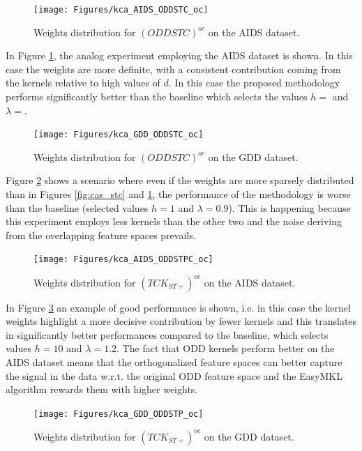 \begin{figure}[ht]
    \centering
    \texttt{[image: Figures/kca\_AIDS\_ODDSTC\_oc]}
    \caption{\footnotesize Weights distribution for $(ODDSTC)^{oc}$ on the AIDS dataset.}
    \label{fig:aids_stc}
\end{figure}

In Figure \ref{fig:aids_stc}, the analog experiment employing the AIDS dataset is shown.
In this case the weights are more definite, with a consistent contribution coming from the
kernels relative to high values of $d$.
In this case the proposed methodology performs significantly better than the baseline which
selects the values $h=$ and $\lambda=$.

\begin{figure}[ht]
    \centering
    \texttt{[image: Figures/kca\_GDD\_ODDSTC\_oc]}
    \caption{\footnotesize Weights distribution for $(ODDSTC)^{oc}$ on the GDD dataset.}
    \label{fig:gdd_stc}
\end{figure}

Figure \ref{fig:gdd_stc} shows a scenario where even if the weights are more
sparsely distributed than in Figures \ref{fig:cas_stc} and \ref{fig:aids_stc},
the performance of the methodology is worse than the baseline (selected values $h=1$ and $\lambda=0.9$).
This is happening because this experiment employs less kernels than the other two and
the noise deriving from the overlapping feature spaces prevails.

\begin{figure}[ht]
    \centering
    \texttt{[image: Figures/kca\_AIDS\_ODDSTPC\_oc]}
    \caption{\footnotesize Weights distribution for $(TCK_{ST+})^{oc}$ on the AIDS dataset.}
    \label{fig:aids_stpc}
\end{figure}

In Figure \ref{fig:aids_stpc} an example of good performance is shown, i.e. in
this case the kernel weights highlight a more decisive contribution by fewer kernels
and this translates in significantly better performances compared to the baseline, which
selects values $h=10$ and $\lambda=1.2$.
The fact that ODD kernels perform better on the AIDS dataset means that the orthogonalized
feature spaces can better capture the signal in the data w.r.t. the original ODD feature space
and the EasyMKL algorithm rewards them with higher weights.

\begin{figure}[ht]
    \centering
    \texttt{[image: Figures/kca\_GDD\_ODDSTP\_oc]}
    \caption{\footnotesize Weights distribution for $(TCK_{ST+})^{oc}$ on the GDD dataset.}
    \label{fig:gdd_stp}
\end{figure}


